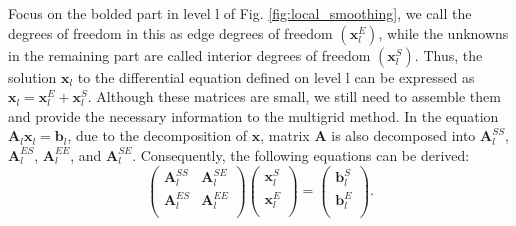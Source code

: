 \documentclass[extra, referee]{gji}
\begin{document}
Focus on the bolded part in level l of Fig. \ref{fig:local_smoothing}, we call the
degrees of freedom in this as edge degrees of freedom $(\mathbf{x}^E_l)$, while
the unknowns in the remaining part are called interior degrees of freedom
$(\mathbf{x}^S_l)$. Thus, the solution $\mathbf{x}_l$ to the differential
equation defined on level l can be expressed as $\mathbf{x}_l = \mathbf{x}^E_l +
\mathbf{x}^S_l$. Although these matrices are small, we still need to assemble
them and provide the necessary information to the multigrid method. In the
equation $\mathbf{A}_l \mathbf{x}_l =\mathbf{b}_l$, due to the decomposition of
$\mathbf{x}$, matrix $\mathbf{A}$ is also decomposed into $\mathbf{A}^{SS}_l$,
$\mathbf{A}^{ES}_l$, $\mathbf{A}^{EE}_l$, and $\mathbf{A}^{SE}_l$. Consequently,
the following equations can be derived:
\begin{equation}
  \label{eq:nine}
  \begin{pmatrix}
    \mathbf{A}^{SS}_l & \mathbf{A}^{SE}_l\\
    \mathbf{A}^{ES}_l & \mathbf{A}^{EE}_l\\
  \end{pmatrix}
  \begin{pmatrix}
    \mathbf{x}^S_l\\
    \mathbf{x}^E_l\\
  \end{pmatrix}
  =
  \begin{pmatrix}
    \mathbf{b}^S_l\\
    \mathbf{b}^E_l\\
  \end{pmatrix}.
\end{equation}
\end{document}
